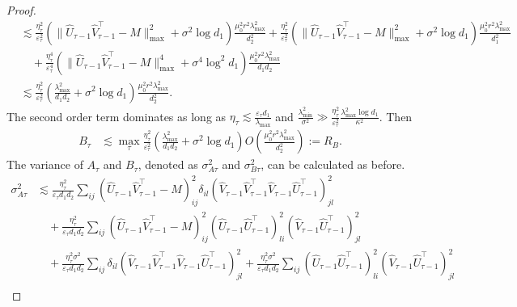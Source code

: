 \documentclass[12pt]{article}
\theoremstyle{plain}
\begin{document}
\begin{proof}
\begin{align*}
    &\lesssim \frac{\eta_\tau^2}{\varepsilon_\tau^2}(\|\widehat{U}_{\tau-1}\widehat{V}_{\tau-1}^{\top} - M\|_{\max}^2+\sigma^2\log d_1)\frac{\mu_0^2r^2\lambda_{\max}^2}{d_2^2} + \frac{\eta_\tau^2}{\varepsilon_\tau^2}(\|\widehat{U}_{\tau-1}\widehat{V}_{\tau-1}^{\top} - M\|_{\max}^2+\sigma^2\log d_1)\frac{\mu_0^2r^2\lambda_{\max}^2}{d_1^2} \\ &\quad  + \frac{\eta_\tau^4}{\varepsilon_\tau^4}(\|\widehat{U}_{\tau-1}\widehat{V}_{\tau-1}^{\top} - M\|_{\max}^4+\sigma^4\log^2d_1)\frac{\mu_0^2r^2\lambda_{\max}^2}{d_1d_2} \\
    &\lesssim \frac{\eta_\tau^2}{\varepsilon_\tau^2}(\frac{\lambda_{\max}^2}{d_1d_2} +\sigma^2\log d_1)\frac{\mu_0^2r^2\lambda_{\max}^2}{d_2^2}.
\end{align*}
The second order term dominates as long as $\eta_\tau\lesssim \frac{\varepsilon_\tau d_1}{\lambda_{\max}}$ and $\frac{\lambda_{\min}^2}{\sigma^2}\gg \frac{\eta_{\tau}^2}{\varepsilon_\tau^2}\frac{\lambda_{\max}^2\log d_1}{\kappa^2}$. Then 
\begin{align*}
    B_{\tau}&\lesssim \max_{\tau} \frac{\eta_{\tau}^2}{\varepsilon_{\tau}^2}(\frac{\lambda_{\max}^2}{d_1d_2} +\sigma^2\log d_1)O(\frac{\mu_0^2r^2\lambda_{\max}^2}{d_2^2}):= R_{B}.
\end{align*}
The variance of $A_{\tau}$ and $B_{\tau}$, denoted as $\sigma_{A\tau}^2$ and $\sigma_{B\tau}^2$, can be calculated as before. 
\begin{align*}
    \sigma_{A\tau}^2&\lesssim \frac{\eta_{\tau}^2}{\varepsilon_{\tau}d_1d_2}\sum_{ij}(\widehat{U}_{\tau-1}\widehat{V}_{\tau-1}^{\top} - M)_{ij}^2\delta_{il}(\widehat{V}_{\tau-1}\widehat{V}_{\tau-1}^{\top}\widehat{V}_{\tau-1}\widehat{U}_{\tau-1}^{\top})_{jl}^2 \\&\quad + \frac{\eta_{\tau}^2}{\varepsilon_{\tau} d_1d_2}\sum_{ij}(\widehat{U}_{\tau-1}\widehat{V}_{\tau-1}^{\top} - M)_{ij}^2(\widehat{U}_{\tau-1}\widehat{U}_{\tau-1}^{\top})_{li}^2(\widehat{V}_{\tau-1}\widehat{U}_{\tau-1}^{\top})_{jl}^2 \\ &\quad + \frac{\eta_{\tau}^2\sigma^2}{\varepsilon_{\tau}d_1d_2}\sum_{ij}\delta_{il}(\widehat{V}_{\tau-1}\widehat{V}_{\tau-1}^{\top}\widehat{V}_{\tau-1}\widehat{U}_{\tau-1}^{\top})_{jl}^2 + \frac{\eta_{\tau}^2\sigma^2}{\varepsilon_{\tau}d_1d_2}\sum_{ij}(\widehat{U}_{\tau-1}\widehat{U}_{\tau-1}^{\top})_{li}^2(\widehat{V}_{\tau-1}\widehat{U}_{\tau-1}^{\top})_{jl}^2 \\

\end{align*}
\end{proof}
\end{document}
